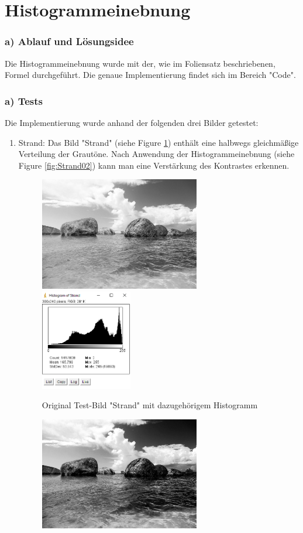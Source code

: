 \documentclass[12pt,german]{article}
\begin{document}
\section{Histogrammeinebnung  }

\subsubsection{a) Ablauf und Lösungsidee}
 Die Histogrammeinebnung wurde mit der, wie im Foliensatz beschriebenen, Formel durchgeführt. Die genaue Implementierung findet sich im Bereich "Code". 
\subsubsection{a) Tests}
Die Implementierung wurde anhand der folgenden drei Bilder getestet:
\begin{enumerate}
\item Strand: 
Das Bild "Strand" (siehe Figure \ref{fig:Strand01}) enthält eine halbwegs gleichmäßige Verteilung der Grautöne. Nach Anwendung der Histogrammeinebnung  (siehe Figure \ref{fig:Strand02}) kann man eine Verstärkung des Kontrastes erkennen.
\begin{figure}[h!] \centering
	\includegraphics[width=7cm]{../testData/Results/Strand/Strand.jpg}
	\includegraphics[width=4cm]{../testData/Results/Strand/Strand-histogram.png}
	\caption{Original Test-Bild "Strand" mit dazugehörigem Histogramm}
	 \label{fig:Strand01}
\end{figure}
\begin{figure}[h!] \centering
	\includegraphics[width=7cm]{../testData/Results/Strand/Strand-equalized.jpg}

\end{figure}
\end{enumerate}
\end{document}
